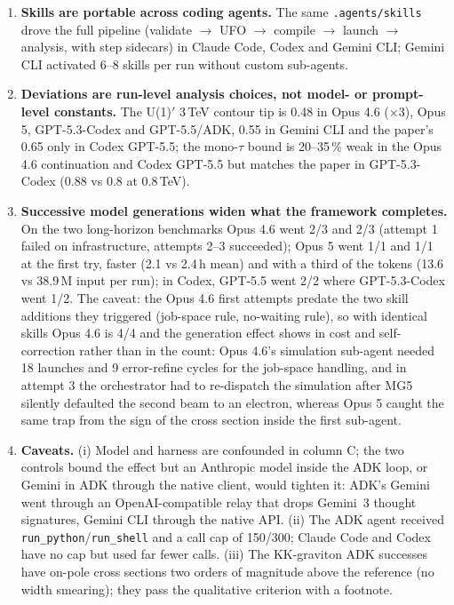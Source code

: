 \documentclass[10pt,a4paper]{article}
\newcommand{\code}[1]{\texttt{#1}}
\begin{document}
\begin{enumerate}
\item \textbf{Skills are portable across coding agents.} The same \code{.agents/skills} drove the full pipeline (validate $\to$ UFO $\to$ compile $\to$ launch $\to$ analysis, with step sidecars) in Claude Code, Codex and Gemini CLI; Gemini CLI activated 6--8 skills per run without custom sub-agents.
\item \textbf{Deviations are run-level analysis choices, not model- or prompt-level constants.} The U(1)$'$ 3\,TeV contour tip is 0.48 in Opus 4.6 ($\times$3), Opus 5, GPT-5.3-Codex and GPT-5.5/ADK, 0.55 in Gemini CLI and the paper's 0.65 only in Codex GPT-5.5; the mono-$\tau$ bound is 20--35\,\% weak in the Opus 4.6 continuation and Codex GPT-5.5 but matches the paper in GPT-5.3-Codex (0.88 vs 0.8 at 0.8\,TeV).
\item \textbf{Successive model generations widen what the framework completes.} On the two long-horizon benchmarks Opus 4.6 went 2/3 and 2/3 (attempt 1 failed on infrastructure, attempts 2--3 succeeded); Opus 5 went 1/1 and 1/1 at the first try, faster (2.1 vs 2.4\,h mean) and with a third of the tokens (13.6 vs 38.9\,M input per run); in Codex, GPT-5.5 went 2/2 where GPT-5.3-Codex went 1/2. The caveat: the Opus 4.6 first attempts predate the two skill additions they triggered (job-space rule, no-waiting rule), so with identical skills Opus 4.6 is 4/4 and the generation effect shows in cost and self-correction rather than in the count: Opus 4.6's simulation sub-agent needed 18 launches and 9 error-refine cycles for the job-space handling, and in attempt 3 the orchestrator had to re-dispatch the simulation after MG5 silently defaulted the second beam to an electron, whereas Opus 5 caught the same trap from the sign of the cross section inside the first sub-agent.
\item \textbf{Caveats.} (i) Model and harness are confounded in column C; the two controls bound the effect but an Anthropic model inside the ADK loop, or Gemini in ADK through the native client, would tighten it: ADK's Gemini went through an OpenAI-compatible relay that drops Gemini~3 thought signatures, Gemini CLI through the native API. (ii) The ADK agent received \code{run\_python}/\code{run\_shell} and a call cap of 150/300; Claude Code and Codex have no cap but used far fewer calls. (iii) The KK-graviton ADK successes have on-pole cross sections two orders of magnitude above the reference (no width smearing); they pass the qualitative criterion with a footnote.
\end{enumerate}
\end{document}
